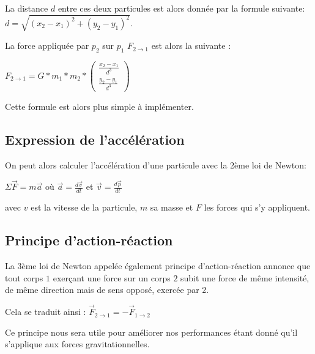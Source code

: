 La distance $d$ entre ces deux particules est alors donnée par la formule suivante:
$d= \sqrt{(x_2-x_1)^2 + (y_2 - y_1)^2}$.

La force appliquée par $p_2$ sur $p_1$ $F_{2 \rightarrow 1}$ est alors la suivante :

\begin{center}
$F_{2 \rightarrow 1}=G*m_1*m_2*\begin{pmatrix}
\frac{x_2 -x_1}{d^3}\\
\frac{y_2 -y_1}{d^3}
\end{pmatrix}
$
\end{center}

\vspace{2mm}
Cette formule est alors plus simple à implémenter.

\vspace{3mm}
\subsection{Expression de l'accélération}
\vspace{2mm}

On peut alors calculer l'accélération d'une particule avec la 2ème loi de Newton:
\begin{center}
    

$
\Sigma \vec{F} = m \vec{a}
$
où 
$\vec{a}=\frac{d\vec{v}}{dt}
$ et $ \vec{v}= \frac{d\vec{p}}{dt}
$
\end{center}


avec $v$ est la vitesse de la particule, $m$ sa masse et $F$ les forces qui s'y appliquent.

\vspace{2mm}
\subsection{Principe d'action-réaction}
\vspace{2mm}

La 3ème loi de Newton appelée également principe d'action-réaction annonce que tout corps $1$ exerçant une force sur un corps $2$ subit une force de même intensité, de même direction mais de sens opposé, exercée par 2.

\vspace{2mm}

Cela se traduit ainsi :
$\vec{F}_{2 \rightarrow 1} = -\vec{F}_{1 \rightarrow 2}  $

\vspace{2mm}
Ce principe nous sera utile pour améliorer nos performances étant donné qu'il s'applique aux forces gravitationnelles.


